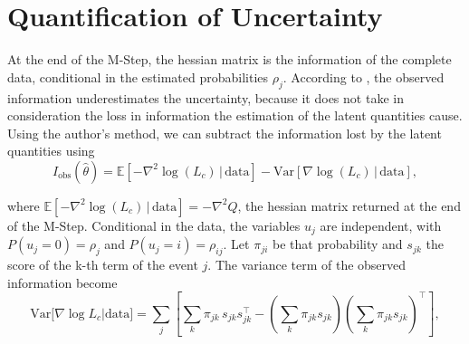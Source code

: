 %

\section{Quantification of Uncertainty}
\label{sec-uncertainty}

At the end of the M-Step, the hessian matrix is the information of the complete data, conditional in the estimated probabilities $\rho_{j}$. According to , the observed information underestimates the uncertainty, because it does not take in consideration the loss in information the estimation of the latent quantities cause. Using the author's method, we can subtract the information lost by the latent quantities using
\begin{equation}
  \label{eq-inf-obser}
  I_{\text{obs}}(\hat{\theta}) = \mathds{E}\left[- \nabla^{2}\log(L_{c})\, | \, \text{data}\right] - \text{Var}\left[\nabla\log(L_{c})\, | \,\text{data}\right],
\end{equation}

\noindent where $\mathds{E}\left[- \nabla^{2}\log(L_{c})\, | \, \text{data}\right] = -\nabla^{2}Q$, the hessian matrix returned at the end of the M-Step. Conditional in the data, the variables $u_{j}$ are independent, with $P(u_{j} = 0) = \rho_{j}$ and $P(u_{j} = i) = \rho_{ij}$. Let $\pi_{ji}$ be that probability and $s_{jk}$ the score of the k-th term of the event $j$. The variance term of the observed information become
\begin{equation}
  \label{eq-var-latent}
  \mathrm{Var}\big[\nabla\log L_c | \text{data}\big] = \sum_{j}\left[\sum_{k}\pi_{jk}\,s_{jk}s_{jk}^{\top} - \left(\sum_{k}\pi_{jk}s_{jk}\right)\left(\sum_{k}\pi_{jk}s_{jk}\right)^{\top}\right],
\end{equation}

